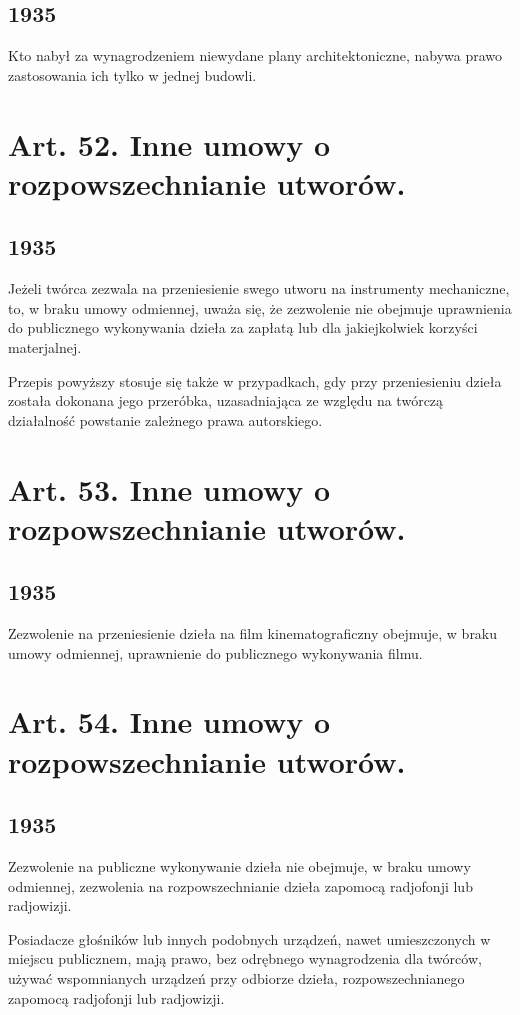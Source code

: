 \documentclass[withmarginpar]{book}
\begin{document}
\subsection{1935}
\label{sec:art.-51-1}

Kto nabył za wynagrodzeniem niewydane plany architektoniczne, nabywa
prawo zastosowania ich tylko w jednej budowli.

\section{Art. 52. Inne umowy o rozpowszechnianie utworów.}
\label{sec:art.-52}
\subsection{1935}
\label{sec:art.-52-1}

Jeżeli twórca zezwala na przeniesienie swego utworu na instrumenty
mechaniczne, to, w braku umowy odmiennej, uważa się, że zezwolenie nie
obejmuje uprawnienia do publicznego wykonywania dzieła za zapłatą lub
dla jakiejkolwiek korzyści materjalnej.

Przepis powyższy stosuje się także w przypadkach, gdy przy
przeniesieniu dzieła została dokonana jego przeróbka, uzasadniająca ze
względu na twórczą działalność powstanie zależnego prawa autorskiego.


\section{Art. 53. Inne umowy o rozpowszechnianie utworów.}
\label{sec:art.-53}
\subsection{1935}
\label{sec:art.-53-1}

Zezwolenie na przeniesienie dzieła na film kinematograficzny obejmuje,
w braku umowy odmiennej, uprawnienie do publicznego wykonywania filmu.

\section{Art. 54. Inne umowy o rozpowszechnianie utworów.}
\label{sec:art.-54}
\subsection{1935}
\label{sec:art.-54-1}

Zezwolenie na publiczne wykonywanie dzieła nie obejmuje, w braku umowy
odmiennej, zezwolenia na rozpowszechnianie dzieła zapomocą radjofonji
lub radjowizji.

Posiadacze głośników lub innych podobnych urządzeń, nawet
umieszczonych w miejscu publicznem, mają prawo, bez odrębnego
wynagrodzenia dla twórców, używać wspomnianych urządzeń przy odbiorze
dzieła, rozpowszechnianego zapomocą radjofonji lub radjowizji.
\end{document}
